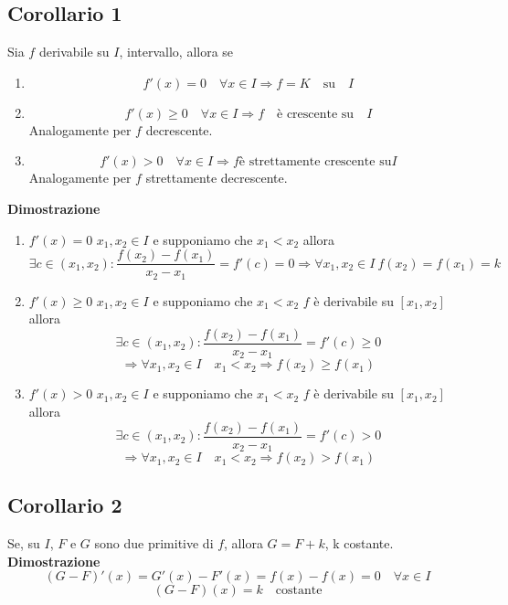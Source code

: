 \documentclass[12pt]{article}
\begin{document}
\subsection{Corollario 1}
Sia $f$ derivabile su $I$, intervallo,
allora se
\begin{enumerate}
  \item \[ f'(x) = 0 \quad \forall x \in I \Rightarrow f=K \quad \text{su} \quad I\]
  \item \[f'(x) \geq 0 \quad \forall x \in I \Rightarrow f \quad \text{è crescente su} \quad I\]
Analogamente per $f$ decrescente.
\item \[f'(x) > 0 \quad \forall x \in I
\Rightarrow f \text{è strettamente crescente su} I\]
Analogamente per $f$ strettamente decrescente.
\end{enumerate}
\textbf{Dimostrazione}
\begin{enumerate}
\item $f'(x)=0$\newline
$x_1, x_2 \in I$ e supponiamo che $x_1<x_2$ allora \[\exists c \in (x_1, x_2): \frac{f(x_2)-f(x_1)}{x_2-x_1} = f'(c) = 0
\Rightarrow \forall x_1, x_2 \in I\ f(x_2) = f(x_1) = k\]
\item $f'(x) \geq 0$\newline
$x_1, x_2 \in I$ e supponiamo che $x_1<x_2$\newline
$f$ è derivabile su $[x_1,x_2]$ allora
\[ \exists c \in (x_1, x_2): 
\frac{f(x_2)-f(x_1)}{x_2 - x_1} = f'(c) \geq 0 
\]
\[
\Rightarrow \forall x_1, x_2 \in I \quad x_1<x_2 \Rightarrow f(x_2) \geq f(x_1) 
\]

\item $f'(x) > 0$\newline
$x_1, x_2 \in I$ e supponiamo che $x_1<x_2$\newline
$f$ è derivabile su $[x_1,x_2]$ allora
\[ \exists c \in (x_1, x_2): 
\frac{f(x_2)-f(x_1)}{x_2 - x_1} = f'(c) > 0
\]
\[
\Rightarrow \forall x_1, x_2 \in I \quad x_1<x_2 \Rightarrow f(x_2) > f(x_1) 
\]
\end{enumerate}

\subsection{Corollario 2}
Se, su $I$, $F$ e $G$ sono due primitive di $f$, allora $G = F+k$, k costante.\newline
\textbf{Dimostrazione}
\[(G-F)'(x) = G'(x) - F'(x) = f(x) - f(x) = 0 \quad \forall x \in I\]
\[ (G-F)(x) = k \quad \text{costante}\]
\end{document}
